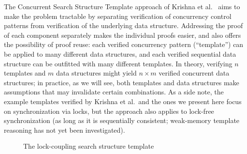 \documentclass[sigplan,screen]{acmart}
\begin{document}
The Concurrent Search Structure Template approach of Krishna et al.~\cite{templates} aims to make the problem tractable by separating verification of concurrency control patterns from verification of the underlying data structure. Addressing the proof of each component separately makes the individual proofs easier, and also offers the possibility of proof reuse: each verified concurrency pattern (``template'') can be applied to many different data structures, and each verified sequential data structure can be outfitted with many different templates. In theory, verifying $n$ templates and $m$ data structures might yield $n \times m$ verified concurrent data structures; in practice, as we will see, both templates and data structures make assumptions that may invalidate certain combinations. %
As a side note, the example templates verified by Krishna et al.~and the ones we present here focus on synchronization via locks, but the approach also applies to lock-free synchronization (as long as it is sequentially consistent; weak-memory template reasoning has not yet been investigated).


\begin{figure}[h]
	\begin{subfigure}[t]{0.45\textwidth}
		 
	\end{subfigure}
	\qquad
	\begin{subfigure}[t]{0.45\textwidth}
		 
	\end{subfigure}
	\caption{The lock-coupling search structure template}
	\label{template-ex}
\end{figure}
\end{document}
